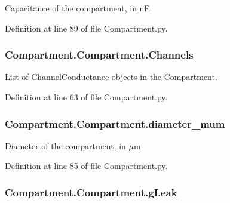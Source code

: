 Capacitance of the compartment, in n\-F. 



Definition at line 89 of file Compartment.\-py.

\hypertarget{class_compartment_1_1_compartment_aa444563be9598d7cc54fd8d10ea6a04f}{
\subsubsection[{Channels}]{\setlength{\rightskip}{0pt plus 5cm}Compartment.\-Compartment.\-Channels}}\label{class_compartment_1_1_compartment_aa444563be9598d7cc54fd8d10ea6a04f}


List of \hyperlink{namespace_channel_conductance}{Channel\-Conductance} objects in the \hyperlink{class_compartment_1_1_compartment}{Compartment}. 



Definition at line 63 of file Compartment.\-py.

\hypertarget{class_compartment_1_1_compartment_aacb7db7022f5d3534d17642d47281cbb}{
\subsubsection[{diameter\-\_\-mum}]{\setlength{\rightskip}{0pt plus 5cm}Compartment.\-Compartment.\-diameter\-\_\-mum}}\label{class_compartment_1_1_compartment_aacb7db7022f5d3534d17642d47281cbb}


Diameter of the compartment, in $\mu$m. 



Definition at line 85 of file Compartment.\-py.

\hypertarget{class_compartment_1_1_compartment_a10d50da6a622982a6483c7cd78482bde}{
\subsubsection[{g\-Leak}]{\setlength{\rightskip}{0pt plus 5cm}Compartment.\-Compartment.\-g\-Leak}}\label{class_compartment_1_1_compartment_a10d50da6a622982a6483c7cd78482bde}


